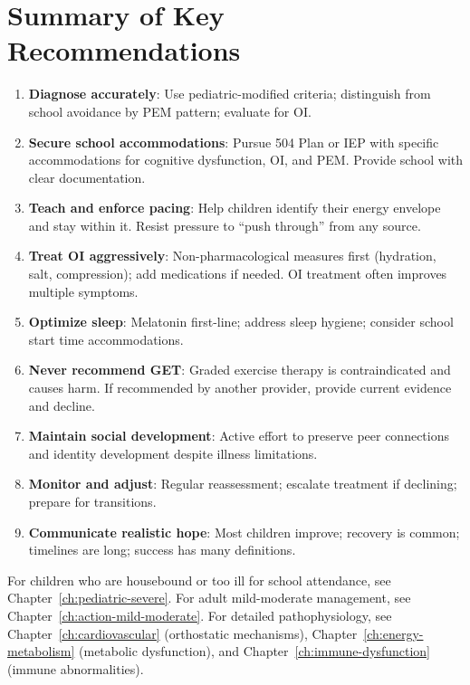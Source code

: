 \section{Summary of Key Recommendations}
\label{sec:ped-ambulatory-summary}

\begin{enumerate}
    \item \textbf{Diagnose accurately}: Use pediatric-modified criteria; distinguish from school avoidance by PEM pattern; evaluate for OI.

    \item \textbf{Secure school accommodations}: Pursue 504 Plan or IEP with specific accommodations for cognitive dysfunction, OI, and PEM. Provide school with clear documentation.

    \item \textbf{Teach and enforce pacing}: Help children identify their energy envelope and stay within it. Resist pressure to ``push through'' from any source.

    \item \textbf{Treat OI aggressively}: Non-pharmacological measures first (hydration, salt, compression); add medications if needed. OI treatment often improves multiple symptoms.

    \item \textbf{Optimize sleep}: Melatonin first-line; address sleep hygiene; consider school start time accommodations.

    \item \textbf{Never recommend GET}: Graded exercise therapy is contraindicated and causes harm. If recommended by another provider, provide current evidence and decline.

    \item \textbf{Maintain social development}: Active effort to preserve peer connections and identity development despite illness limitations.

    \item \textbf{Monitor and adjust}: Regular reassessment; escalate treatment if declining; prepare for transitions.

    \item \textbf{Communicate realistic hope}: Most children improve; recovery is common; timelines are long; success has many definitions.
\end{enumerate}

\begin{continuation}
For children who are housebound or too ill for school attendance, see Chapter~\ref{ch:pediatric-severe}. For adult mild-moderate management, see Chapter~\ref{ch:action-mild-moderate}. For detailed pathophysiology, see Chapter~\ref{ch:cardiovascular} (orthostatic mechanisms), Chapter~\ref{ch:energy-metabolism} (metabolic dysfunction), and Chapter~\ref{ch:immune-dysfunction} (immune abnormalities).
\end{continuation}

